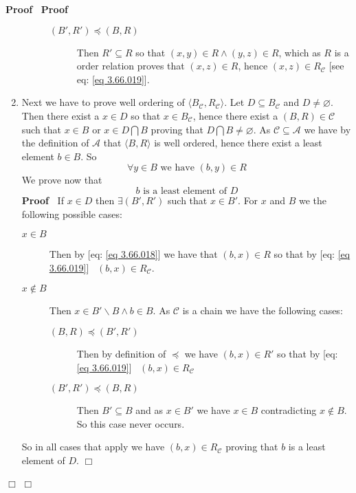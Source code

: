 \documentclass{book}
\newcommand{\nin}{\not\in}
\newenvironment{proof}{\noindent\textbf{Proof\ }}{\hspace*{\fill}$\Box$\medskip}
\begin{document}
\begin{proof}
\begin{proof}
\begin{enumerate}
\begin{description}
\begin{description}
          \item[$(B', R') \preccurlyeq (B, R)$] Then $R' \subseteq R$ so that
          $(x, y) \in R \wedge (y, z) \in R$, which as $R$ is a order relation
          proves that $(x, z) \in R$, hence $(x, z) \in R_{\mathcal{C}}$ [see
          eq: \ref{eq 3.66.019}].
        \end{description}
      \end{description}
      \item Next we have to prove well ordering of $\langle B_{\mathcal{C}},
      R_{\mathcal{C}} \rangle$. Let $D \subseteq B_{\mathcal{C}}$ and $D \neq
      \varnothing$. Then there exist a $x \in D$ so that $x \in
      B_{\mathcal{C}}$, hence there exist a $(B, R) \in \mathcal{C}$ such that
      $x \in B$ or $x \in D \bigcap B$ proving that $D \bigcap B \neq
      \varnothing$. As $\mathcal{C} \subseteq \mathcal{A}$ we have by the
      definition of $\mathcal{A}$ that $\langle B, R \rangle$ is well ordered,
      hence there exist a least element $b \in B$. So
      \begin{equation}
        \label{eq 3.66.018} \forall y \in B \text{ we have } (b, y) \in R
      \end{equation}
      We prove now that
      \[ b \text{ is a least element of } D \]
      \begin{proof}
        If $x \in D$ then $\exists (B', R')$ such that $x \in B'$. For $x$ and
        $B$ we the following possible cases:
        \begin{description}
          \item[$x \in B$] Then by [eq: \ref{eq 3.66.018}] we have that $(b,
          x) \in R$ so that by [eq: \ref{eq 3.66.019}] \ $(b, x) \in
          R_{\mathcal{C}}$.
          
          \item[$x \nin B$] Then $x \in B' \backslash B \wedge b \in B$. As
          $\mathcal{C}$ is a chain we have the following cases:
          \begin{description}
            \item[$(B, R) \preccurlyeq (B', R')$] Then by definition of
            $\preccurlyeq$ we have $(b, x) \in R'$ so that by [eq: \ref{eq
            3.66.019}] \ $(b, x) \in R_{\mathcal{C}}$
            
            \item[$(B', R') \preccurlyeq (B, R)$] Then $B' \subseteq B$ and as
            $x \in B'$ we have $x \in B$ contradicting $x \nin B$. So this
            case never occurs.
          \end{description}
        \end{description}
        So in all cases that apply we have $(b, x) \in R_{\mathcal{C}}$
        proving that $b$ is a least element of $D$.
      \end{proof}
      

\end{enumerate}
\end{proof}
\end{proof}
\end{document}
